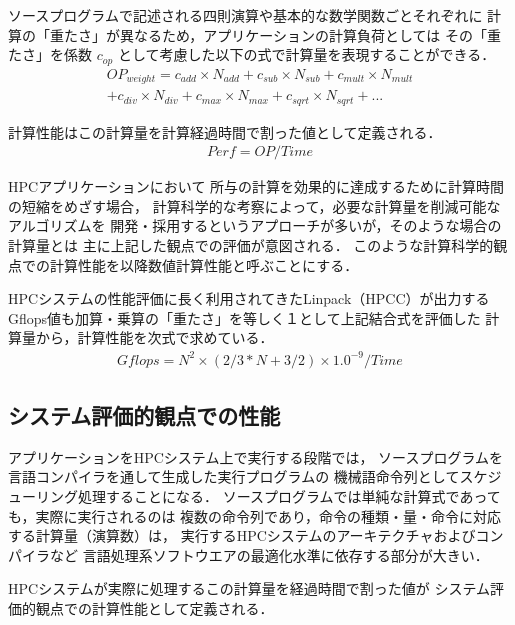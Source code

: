 \documentclass[submit,techrep,noauthor]{ipsj}
\begin{document}
ソースプログラムで記述される四則演算や基本的な数学関数ごとそれぞれに
計算の「重たさ」が異なるため，アプリケーションの計算負荷としては
その「重たさ」を係数
\begin{math} c_{op} \end{math}
として考慮した以下の式で計算量を表現することができる．
\begin{align*}
OP_{weight} =
	c_{add}\times N_{add} + c_{sub}\times N_{sub} + c_{mult}\times N_{mult} \\
	+ c_{div}\times N_{div} + c_{max}\times N_{max} + c_{sqrt}\times N_{sqrt} + ...
\end{align*}

計算性能はこの計算量を計算経過時間で割った値として定義される．
\begin{align*}
Perf = OP / Time	%
\end{align*}

HPCアプリケーションにおいて
所与の計算を効果的に達成するために計算時間の短縮をめざす場合，
計算科学的な考察によって，必要な計算量を削減可能なアルゴリズムを
開発・採用するというアプローチが多いが，そのような場合の計算量とは
主に上記した観点での評価が意図される．
このような計算科学的観点での計算性能を以降数値計算性能と呼ぶことにする．

HPCシステムの性能評価に長く利用されてきたLinpack（HPCC）が出力する
Gflops値も加算・乗算の「重たさ」を等しく１として上記結合式を評価した
計算量から，計算性能を次式で求めている．
\begin{align*}
Gflops = N^{2} \times ( 2/3 * N + 3/2 ) \times 1.0^{-9} / Time 
\end{align*}



\subsection {システム評価的観点での性能}
\label{subsection:system-perf}

アプリケーションをHPCシステム上で実行する段階では，
ソースプログラムを言語コンパイラを通して生成した実行プログラムの
機械語命令列としてスケジューリング処理することになる．
ソースプログラムでは単純な計算式であっても，実際に実行されるのは
複数の命令列であり，命令の種類・量・命令に対応する計算量（演算数）は，
実行するHPCシステムのアーキテクチャおよびコンパイラなど
言語処理系ソフトウエアの最適化水準に依存する部分が大きい．

HPCシステムが実際に処理するこの計算量を経過時間で割った値が
システム評価的観点での計算性能として定義される．
\end{document}
